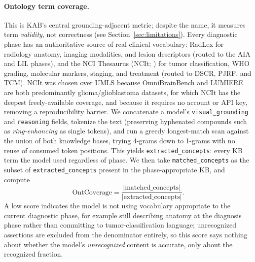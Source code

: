 \documentclass[11pt]{article}
\begin{document}
\paragraph{Ontology term coverage.} This is KAB's central grounding-adjacent metric; despite the name, it measures term \emph{validity}, not correctness (see Section~\ref{sec:limitations}). Every diagnostic phase has an authoritative source of real clinical vocabulary: RadLex \citep{rsna_radlex} for radiology anatomy, imaging modalities, and lesion descriptors (routed to the AIA and LIL phases), and the NCI Thesaurus (NCIt; \citealp{sioutos2007nci}) for tumor classification, WHO grading, molecular markers, staging, and treatment (routed to DSCR, PJRF, and TCM). NCIt was chosen over UMLS because OmniBrainBench and LUMIERE are both predominantly glioma/glioblastoma datasets, for which NCIt has the deepest freely-available coverage, and because it requires no account or API key, removing a reproducibility barrier. We concatenate a model's \texttt{visual\_grounding} and \texttt{reasoning} fields, tokenize the text (preserving hyphenated compounds such as \emph{ring-enhancing} as single tokens), and run a greedy longest-match scan against the union of both knowledge bases, trying 4-grams down to 1-grams with no reuse of consumed token positions. This yields \texttt{extracted\_concepts}: every KB term the model used regardless of phase. We then take \texttt{matched\_concepts} as the subset of \texttt{extracted\_concepts} present in the phase-appropriate KB, and compute
\begin{equation}
  \label{eq:kb-align}
  \text{OntCoverage} = \frac{|\text{matched\_concepts}|}{|\text{extracted\_concepts}|}.
\end{equation}
A low score indicates the model is not using vocabulary appropriate to the current diagnostic phase, for example still describing anatomy at the diagnosis phase rather than committing to tumor-classification language; unrecognized assertions are excluded from the denominator entirely, so this score says nothing about whether the model's \emph{unrecognized} content is accurate, only about the recognized fraction.
\end{document}
